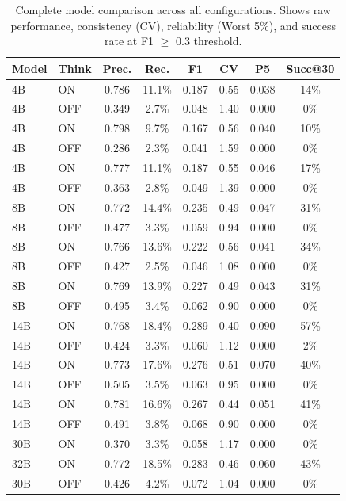 \begin{table}[t]
\centering
\small
\caption{Complete model comparison across all configurations. Shows raw performance, consistency (CV), reliability (Worst 5\%), and success rate at F1 $\geq$ 0.3 threshold.}
\label{tab:complete_comparison}
\begin{tabular}{llcccccc}
\toprule
\textbf{Model} & \textbf{Think} & \textbf{Prec.} & \textbf{Rec.} & \textbf{F1} & \textbf{CV} & \textbf{P5} & \textbf{Succ@30} \\
\midrule
4B  & ON  & 0.786 & 11.1\% & 0.187 & 0.55 & 0.038 & 14\% \\
4B  & OFF & 0.349 & 2.7\% & 0.048 & 1.40 & 0.000 & 0\% \\
4B  & ON  & 0.798 & 9.7\% & 0.167 & 0.56 & 0.040 & 10\% \\
4B  & OFF & 0.286 & 2.3\% & 0.041 & 1.59 & 0.000 & 0\% \\
4B  & ON  & 0.777 & 11.1\% & 0.187 & 0.55 & 0.046 & 17\% \\
4B  & OFF & 0.363 & 2.8\% & 0.049 & 1.39 & 0.000 & 0\% \\
8B  & ON  & 0.772 & 14.4\% & 0.235 & 0.49 & 0.047 & 31\% \\
8B  & OFF & 0.477 & 3.3\% & 0.059 & 0.94 & 0.000 & 0\% \\
8B  & ON  & 0.766 & 13.6\% & 0.222 & 0.56 & 0.041 & 34\% \\
8B  & OFF & 0.427 & 2.5\% & 0.046 & 1.08 & 0.000 & 0\% \\
8B  & ON  & 0.769 & 13.9\% & 0.227 & 0.49 & 0.043 & 31\% \\
8B  & OFF & 0.495 & 3.4\% & 0.062 & 0.90 & 0.000 & 0\% \\
14B & ON  & 0.768 & 18.4\% & 0.289 & 0.40 & 0.090 & 57\% \\
14B & OFF & 0.424 & 3.3\% & 0.060 & 1.12 & 0.000 & 2\% \\
14B & ON  & 0.773 & 17.6\% & 0.276 & 0.51 & 0.070 & 40\% \\
14B & OFF & 0.505 & 3.5\% & 0.063 & 0.95 & 0.000 & 0\% \\
14B & ON  & 0.781 & 16.6\% & 0.267 & 0.44 & 0.051 & 41\% \\
14B & OFF & 0.491 & 3.8\% & 0.068 & 0.90 & 0.000 & 0\% \\
30B & ON  & 0.370 & 3.3\% & 0.058 & 1.17 & 0.000 & 0\% \\
32B & ON  & 0.772 & 18.5\% & 0.283 & 0.46 & 0.060 & 43\% \\
30B & OFF & 0.426 & 4.2\% & 0.072 & 1.04 & 0.000 & 0\% \\

\end{tabular}
\end{table}
